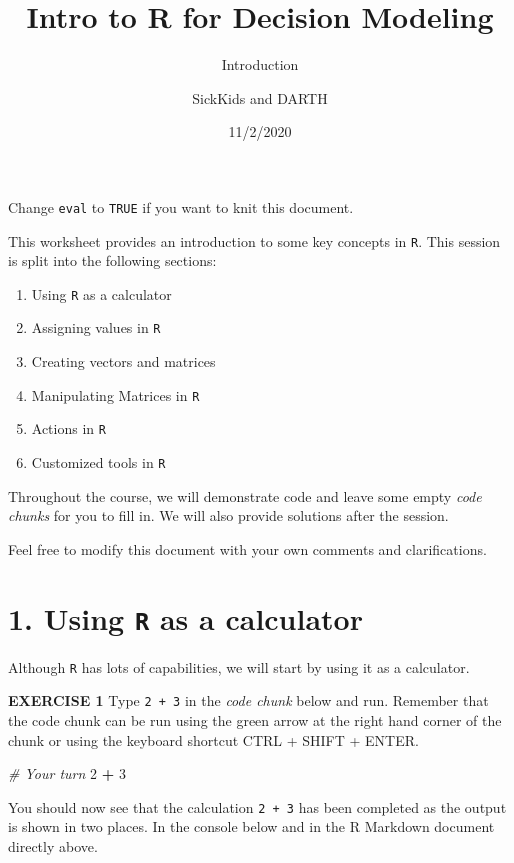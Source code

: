 \documentclass[
]{article}
\title{Intro to R for Decision Modeling}
\subtitle{Introduction}
\author{SickKids and DARTH}
\date{11/2/2020}
\newenvironment{Shaded}{\begin{snugshade}}{\end{snugshade}}
\newcommand{\CommentTok}[1]{\textcolor[rgb]{0.56,0.35,0.01}{\textit{#1}}}
\newcommand{\DecValTok}[1]{\textcolor[rgb]{0.00,0.00,0.81}{#1}}
\newcommand{\OperatorTok}[1]{\textcolor[rgb]{0.81,0.36,0.00}{\textbf{#1}}}
\newcommand{\StringTok}[1]{\textcolor[rgb]{0.31,0.60,0.02}{#1}}
\begin{document}
\maketitle

Change \texttt{eval} to \texttt{TRUE} if you want to knit this document.

This worksheet provides an introduction to some key concepts in
\texttt{R}. This session is split into the following sections:

\begin{enumerate}
\def\labelenumi{\arabic{enumi}.}
\item
  Using \texttt{R} as a calculator
\item
  Assigning values in \texttt{R}
\item
  Creating vectors and matrices
\item
  Manipulating Matrices in \texttt{R}
\item
  Actions in \texttt{R}
\item
  Customized tools in \texttt{R}
\end{enumerate}

Throughout the course, we will demonstrate code and leave some empty
\emph{code chunks} for you to fill in. We will also provide solutions
after the session.

Feel free to modify this document with your own comments and
clarifications.

\hypertarget{using-r-as-a-calculator}{%
\section{\texorpdfstring{1. Using \texttt{R} as a
calculator}{1. Using R as a calculator}}\label{using-r-as-a-calculator}}

Although \texttt{R} has lots of capabilities, we will start by using it
as a calculator.

\textbf{EXERCISE 1} Type \texttt{2\ +\ 3} in the \emph{code chunk} below
and run. Remember that the code chunk can be run using the green arrow
at the right hand corner of the chunk or using the keyboard shortcut
CTRL + SHIFT + ENTER.

\begin{Shaded}
\begin{Highlighting}[]
\CommentTok{# Your turn}
\DecValTok{2} \OperatorTok{+}\StringTok{ }\DecValTok{3}
\end{Highlighting}
\end{Shaded}

You should now see that the calculation \texttt{2\ +\ 3} has been
completed as the output is shown in two places. In the console below and
in the R Markdown document directly above.
\end{document}
